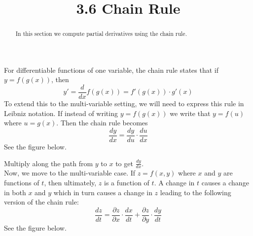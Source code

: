 \documentclass[handout]{ximera}
\title{3.6 Chain Rule}
\begin{document}
\begin{abstract}
In this section we compute partial derivatives using the chain rule.
\end{abstract}

\maketitle

For differentiable functions of one variable, the chain rule states that 
if $y = f(g(x))$, then 
\[
y' = \frac{d}{dx} f(g(x)) = f'(g(x)) \cdot g'(x)
\]
To extend this to the multi-variable setting, we will need to express this rule 
in Leibniz notation.
If instead of writing $y = f(g(x))$ we write that $y = f(u)$ where $ u = g(x)$.
Then the chain rule becomes
\[
\frac{dy}{dx} = \frac{dy}{du} \cdot \frac{du}{dx}
\]
See the figure below.
\begin{image}
\end{image}
Multiply along the path from $y$ to $x$ to get $\frac{dy}{dx}$.\\




Now, we move to the multi-variable case. If $z = f(x,y)$ where $x$ and $y$ are 
functions of $t$, then ultimately, $z$ is a function of $t$.
A change in $t$ causes a change in both $x$ and $y$ which in turn causes a 
change in $z$ leading to the following version of the chain rule:
\[
\frac{dz}{dt} = \frac{\partial z}{\partial x} \cdot \frac{dx}{dt} + \frac{\partial z}{\partial y} \cdot \frac{dy}{dt}
\]
See the figure below.
\begin{image}
\end{image}
\end{document}
